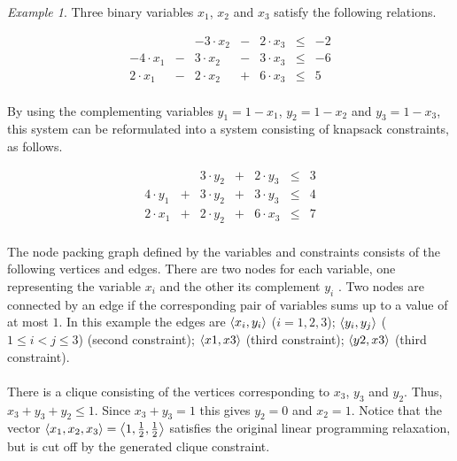 \documentclass[titlepage]{book}
\theoremstyle{plain}
\theoremstyle{definition}
\theoremstyle{remark}
\newtheorem{example}{Example}
\begin{document}
\begin{example}
Three binary variables $x_1$, $x_2$ and $x_3$ satisfy the following relations.

\begin{equation}
\begin{array}{rcrcrcr}
&&-3\cdot x_2&-&2\cdot x_3&\leq&-2\\
-4\cdot x_1&-&3\cdot x_2&-&3\cdot x_3&\leq&-6\\
2\cdot x_1&-&2\cdot x_2&+&6\cdot x_3&\leq&5
\end{array}
\end{equation}

\paragraph{}
By using the complementing variables $y_1=1-x_1$, $y_2=1-x_2$ and $y_3=1-x_3$, this system can be reformulated into a system consisting of knapsack constraints, as follows.

\begin{equation}
\begin{array}{rcrcrcr}
&&3\cdot y_2&+&2\cdot y_3&\leq&3\\
4\cdot y_1&+&3\cdot y_2&+&3\cdot y_3&\leq&4\\
2\cdot x_1&+&2\cdot y_2&+&6\cdot x_3&\leq&7
\end{array}
\end{equation}

\paragraph{}
The node packing graph defined by the variables and constraints consists of the following vertices and edges. There are two nodes for each variable, one representing the variable $x_i$ and the other its complement $y_i$ . Two nodes are connected by an edge if the corresponding pair of variables sums up to a value of at most $1$. In this example the edges are $\left\langle x_i,y_i \right\rangle$ ($i=1,2,3$); $\left\langle y_i,y_j \right\rangle$ ($1\leq i < j \leq 3$) (second constraint); $\left\langle x1,x3 \right\rangle$ (third constraint); $\left\langle y2,x3 \right\rangle$ (third constraint).


\paragraph{}
There is a clique consisting of the vertices corresponding to $x_3$, $y_3$ and $y_2$. Thus, $x_3+y_3+y_2\leq 1$. Since $x_3+y_3=1$ this gives $y_2=0$ and $x_2=1$. Notice that the vector $\left\langle x_1,x_2,x_3 \right\rangle=\left\langle 1,\tfrac{1}{2},\tfrac{1}{2} \right\rangle$ satisfies the original linear programming relaxation, but is cut off by the generated clique constraint.
\end{example}
\end{document}
